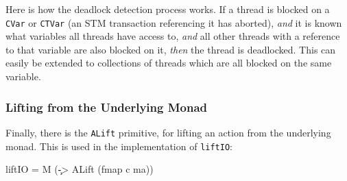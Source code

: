 


Here is how the deadlock detection process works. If a thread is
blocked on a \verb|CVar| or \verb|CTVar| (an STM transaction
referencing it has aborted), \emph{and} it is known what variables all
threads have access to, \emph{and} all other threads with a reference
to that variable are also blocked on it, \emph{then} the thread is
deadlocked. This can easily be extended to collections of threads
which are all blocked on the same variable.

\subsubsection{Lifting from the Underlying Monad}
\label{sec:execution-primops-lift}

Finally, there is the \verb|ALift| primitive, for lifting an action
from the underlying monad. This is used in the implementation of
\verb|liftIO|:

\begin{haskellcode}
liftIO = M (\c -> ALift (fmap c ma))
\end{haskellcode}

